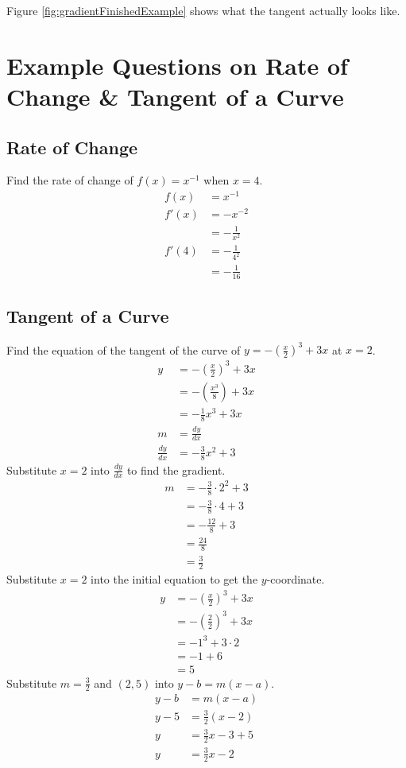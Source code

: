 Figure \ref{fig:gradientFinishedExample} shows what the tangent actually looks like.


\section{Example Questions on Rate of Change \& Tangent of a Curve}
\label{sec:derivativeExamples}
\subsection{Rate of Change}
Find the rate of change of $f(x) = x^{-1}$ when $x=4$.
\begin{align*}
	f(x) &= x^{-1}\\
	f'(x) &= -x^{-2}\\
	&= -\frac{1}{x^2}\\
	f'(4) &= -\frac{1}{4^2}\\
	&= -\frac{1}{16}
\end{align*}

\subsection{Tangent of a Curve}
Find the equation of the tangent of the curve of $y=-\left(\frac{x}{2}\right)^3+3x$ at $x=2$.
\begin{align*}
	y &= -\left(\frac{x}{2}\right)^3+3x\\
	&= -\left(\frac{x^3}{8}\right)+3x\\
	&= -\frac{1}{8}x^3+3x\\[1.5em]
	m&=\frac{dy}{dx}\\
	\frac{dy}{dx} &= -\frac{3}{8}x^2+3
\end{align*}
Substitute $x=2$ into $\frac{dy}{dx}$ to find the gradient.
\begin{align*}
	m &= -\frac{3}{8} \cdot 2^2+3\\
	&=-\frac{3}{8} \cdot 4 + 3\\
	&=-\frac{12}{8} + 3\\
	&=\frac{24}{8}\\
	&=\frac{3}{2}
\end{align*}
Substitute $x=2$ into the initial equation to get the $y$-coordinate.
\begin{align*}
	y&=-\left(\frac{x}{2}\right)^3+3x\\
	&=-\left(\frac{2}{2}\right)^3+3x\\
	&=-1^3 + 3 \cdot 2\\
	&=-1 + 6\\
	&=5
\end{align*}
Substitute $m=\frac{3}{2}$ and $(2,5)$ into $y-b=m(x-a)$.
\begin{align*}
	y-b&=m(x-a)\\
	y-5&=\frac{3}{2}\left(x-2\right)\\
	y&=\frac{3}{2}x-3+5\\
	y&=\frac{3}{2}x-2
\end{align*}


